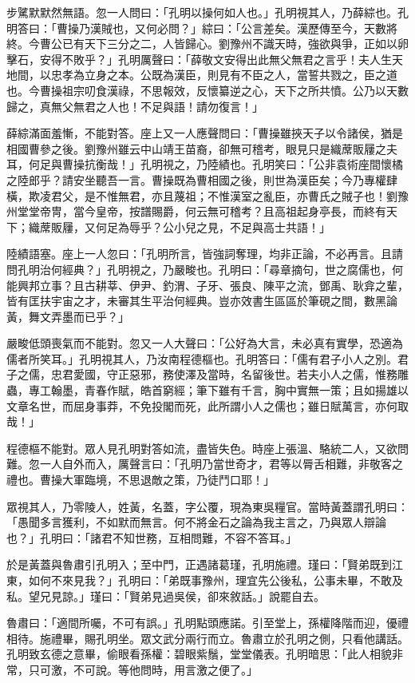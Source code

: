 步騭默默然無語。忽一人問曰：「孔明以操何如人也。」孔明視其人，乃薛綜也。孔明答曰：「曹操乃漢賊也，又何必問？」綜曰：「公言差矣。漢歷傳至今，天數將終。今曹公已有天下三分之二，人皆歸心。劉豫州不識天時，強欲與爭，正如以卵擊石，安得不敗乎？」孔明厲聲曰：「薛敬文安得出此無父無君之言乎！夫人生天地間，以忠孝為立身之本。公既為漢臣，則見有不臣之人，當誓共戮之，臣之道也。今曹操祖宗叨食漢祿，不思報效，反懷纂逆之心，天下之所共憤。公乃以天數歸之，真無父無君之人也！不足與語！請勿復言！」

薛綜滿面羞慚，不能對答。座上又一人應聲問曰：「曹操雖挾天子以令諸侯，猶是相國曹參之後。劉豫州雖云中山靖王苗裔，卻無可稽考，眼見只是織蓆販屨之夫耳，何足與曹操抗衡哉！」孔明視之，乃陸績也。孔明笑曰：「公非袁術座間懷橘之陸郎乎？請安坐聽吾一言。曹操既為曹相國之後，則世為漢臣矣；今乃專權肆橫，欺凌君父，是不惟無君，亦且蔑祖；不惟漢室之亂臣，亦曹氏之賊子也！劉豫州堂堂帝冑，當今皇帝，按譜賜爵，何云無可稽考？且高祖起身亭長，而終有天下；織蓆販屨，又何足為辱乎？公小兒之見，不足與高士共語！」

陸績語塞。座上一人忽曰：「孔明所言，皆強詞奪理，均非正論，不必再言。且請問孔明治何經典？」孔明視之，乃嚴畯也。孔明曰：「尋章摘句，世之腐儒也，何能興邦立事？且古耕莘、伊尹、釣渭、子牙、張良、陳平之流，鄧禹、耿弇之輩，皆有匡扶宇宙之才，未審其生平治何經典。豈亦效書生區區於筆硯之間，數黑論黃，舞文弄墨而已乎？」

嚴畯低頭喪氣而不能對。忽又一人大聲曰：「公好為大言，未必真有實學，恐適為儒者所笑耳。」孔明視其人，乃汝南程德樞也。孔明答曰：「儒有君子小人之別。君子之儒，忠君愛國，守正惡邪，務使澤及當時，名留後世。若夫小人之儒，惟務雕蟲，專工翰墨，青春作賦，皓首窮經；筆下雖有千言，胸中實無一策；且如揚雄以文章名世，而屈身事莽，不免投閣而死，此所謂小人之儒也；雖日賦萬言，亦何取哉！」

程德樞不能對。眾人見孔明對答如流，盡皆失色。時座上張溫、駱統二人，又欲問難。忽一人自外而入，厲聲言曰：「孔明乃當世奇才，君等以脣舌相難，非敬客之禮也。曹操大軍臨境，不思退敵之策，乃徒鬥口耶！」

眾視其人，乃零陵人，姓黃，名蓋，字公覆，現為東吳糧官。當時黃蓋謂孔明曰：「愚聞多言獲利，不如默而無言。何不將金石之論為我主言之，乃與眾人辯論也？」孔明曰：「諸君不知世務，互相問難，不容不答耳。」

於是黃蓋與魯肅引孔明入；至中門，正遇諸葛瑾，孔明施禮。瑾曰：「賢弟既到江東，如何不來見我？」孔明曰：「弟既事豫州，理宜先公後私，公事未畢，不敢及私。望兄見諒。」瑾曰：「賢弟見過吳侯，卻來敘話。」說罷自去。

魯肅曰：「適間所囑，不可有誤。」孔明點頭應諾。引至堂上，孫權降階而迎，優禮相待。施禮畢，賜孔明坐。眾文武分兩行而立。魯肅立於孔明之側，只看他講話。孔明致玄德之意畢，偷眼看孫權：碧眼紫鬚，堂堂儀表。孔明暗思：「此人相貌非常，只可激，不可說。等他問時，用言激之便了。」

